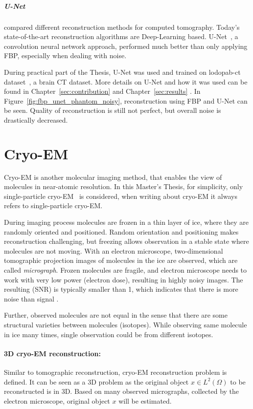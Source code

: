 \subparagraph{U-Net}
\citet{ct-reconstruction-comparison} compared different reconstruction methods for computed tomography. 
Today's state-of-the-art reconstruction algorithms are Deep-Learning based.
U-Net~\cite{unet-tomography}, a convolution neural network approach, performed
much better than only applying FBP, especially when dealing with noise.

During practical part of the Thesis, U-Net was used and trained on lodopab-ct dataset~\cite{lodopab-dataset}, a brain CT dataset. 
More details on U-Net and how it was used can be found in 
Chapter~\ref{sec:contribution} \textit{} and 
Chapter~\ref{sec:results} \textit{}.
In Figure~\ref{fig:fbp_unet_phantom_noisy}, reconstruction using FBP and U-Net can be seen.
Quality of reconstruction is still not perfect, but overall noise is drastically decreased.


\section{Cryo-EM}
Cryo-EM is another molecular imaging method, that enables the view of molecules in near-atomic resolution.
In this Master's Thesis, for simplicity, only single-particle cryo-EM~\cite{singleParticleCryoEm} is considered, 
when writing about cryo-EM it always refers to single-particle cryo-EM.

During imaging process molecules are frozen in a thin layer of ice, where they are randomly oriented and positioned. 
Random orientation and positioning makes reconstruction challenging, 
but freezing allows observation in a stable state where molecules are not moving.
With an electron microscope, two-dimensional tomographic projection images of molecules in the ice are observed,
which are called \textit{micrograph}. 
Frozen molecules are fragile, and electron microscope needs to work with
very low power (electron dose), resulting in highly noisy images. The resulting (SNR)
is typically smaller than 1, which indicates that there is more noise than signal \cite{cryoEmMath2}.

Further, observed molecules are not equal in the sense that there are some structural varieties between
molecules (isotopes). While observing same molecule in ice many times, single observation could be from different isotopes.

\paragraph{3D cryo-EM reconstruction:}
Similar to tomographic reconstruction, cryo-EM reconstruction problem \cite{cryoEmMath} is defined.
It can be seen as a 3D problem as the original object $x \in L^2(\Omega)$ to be reconstructed is in 3D.
Based on many observed micrographs, collected by the electron microscope, original object $x$ will be estimated.

